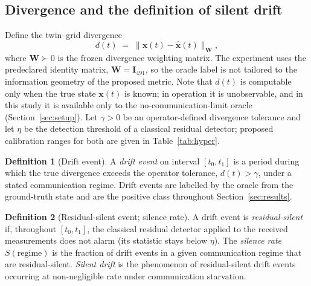 \documentclass[journal]{IEEEtran}
\theoremstyle{plain}
\theoremstyle{definition}
\newtheorem{definition}{Definition}
\theoremstyle{remark}
\newcommand{\bx}{\mathbf{x}}
\newcommand{\bxh}{\hat{\mathbf{x}}}
\newcommand{\bW}{\mathbf{W}}
\newcommand{\bI}{\mathbf{I}}
\begin{document}
\subsection{Divergence and the definition of silent drift}
Define the twin--grid divergence
\begin{equation}
d(t)\;=\;\lVert \bx(t)-\bxh(t)\rVert_{\bW},
\label{eq:divergence}
\end{equation}
where $\bW\succ0$ is the frozen divergence weighting matrix. The
experiment uses the predeclared identity matrix, $\bW=\bI_{491}$, so the
oracle label is not tailored to the information geometry of the proposed
metric. Note that $d(t)$ is computable only when the true state
$\bx(t)$ is known; in operation it is unobservable, and in this study it
is available only to the no-communication-limit oracle
(Section~\ref{sec:setup}). Let $\gamma>0$ be an operator-defined
divergence tolerance and let $\eta$ be the detection threshold of a
classical residual detector; proposed calibration ranges for both are
given in Table~\ref{tab:hyper}.

\begin{definition}[Drift event]
\label{def:driftevent}
A \emph{drift event} on interval $[t_0,t_1]$ is a period during which the
true divergence exceeds the operator tolerance, $d(t)>\gamma$, under a
stated communication regime. Drift events are labelled by the oracle from
the ground-truth state and are the positive class throughout
Section~\ref{sec:results}.
\end{definition}

\begin{definition}[Residual-silent event; silence rate]
\label{def:silentdrift}
A drift event is \emph{residual-silent} if, throughout $[t_0,t_1]$, the
classical residual detector applied to the received measurements does not
alarm (its statistic stays below $\eta$). The \emph{silence rate}
$S(\text{regime})$ is the fraction of drift events in a given
communication regime that are residual-silent. \emph{Silent drift} is the
phenomenon of residual-silent drift events occurring at non-negligible
rate under communication starvation.
\end{definition}
\end{document}
